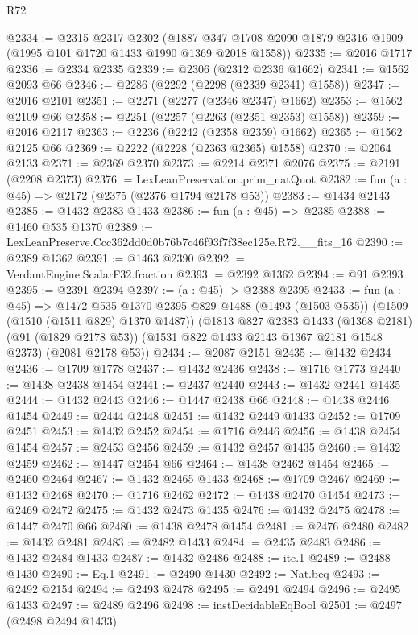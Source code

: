\begin{lexlean}{R72}
\begin{coremodule}
@2334 := @2315
    @2317
    @2302
    (@1887 @347 @1708 @2090 @1879 @2316 @1909 (@1995 @101 @1720 @1433 @1990 @1369 @2018 @1558))
@2335 := @2016 @1717
@2336 := @2334 @2335
@2339 := @2306 (@2312 @2336 @1662)
@2341 := @1562 @2093 @66
@2346 := @2286 (@2292 (@2298 (@2339 @2341) @1558))
@2347 := @2016 @2101
@2351 := @2271 (@2277 (@2346 @2347) @1662)
@2353 := @1562 @2109 @66
@2358 := @2251 (@2257 (@2263 (@2351 @2353) @1558))
@2359 := @2016 @2117
@2363 := @2236 (@2242 (@2358 @2359) @1662)
@2365 := @1562 @2125 @66
@2369 := @2222 (@2228 (@2363 @2365) @1558)
@2370 := @2064 @2133
@2371 := @2369 @2370
@2373 := @2214 @2371 @2076
@2375 := @2191 (@2208 @2373)
@2376 := LexLeanPreservation.prim_natQuot
@2382 := fun (a : @45) => @2172 (@2375 (@2376 @1794 @2178 @53))
@2383 := @1434 @2143
@2385 := @1432 @2383 @1433
@2386 := fun (a : @45) => @2385
@2388 := @1460 @535 @1370
@2389 := LexLeanPreserve.Ccc362dd0d0b76b7c46f93f7f38ec125e.R72.__fits_16
@2390 := @2389 @1362
@2391 := @1463 @2390
@2392 := VerdantEngine.ScalarF32.fraction
@2393 := @2392 @1362
@2394 := @91 @2393
@2395 := @2391 @2394
@2397 := (a : @45) -> @2388 @2395
@2433 := fun (a : @45) =>
  @1472
    @535
    @1370
    @2395
    @829
    @1488
    (@1493 (@1503 @535))
    (@1509 (@1510 (@1511 @829) @1370 @1487))
    (@1813
      @827
      @2383
      @1433
      (@1368 @2181)
      (@91 (@1829 @2178 @53))
      (@1531 @822 @1433 @2143 @1367 @2181 @1548 @2373)
      (@2081 @2178 @53))
@2434 := @2087 @2151
@2435 := @1432 @2434
@2436 := @1709 @1778
@2437 := @1432 @2436
@2438 := @1716 @1773
@2440 := @1438 @2438 @1454
@2441 := @2437 @2440
@2443 := @1432 @2441 @1435
@2444 := @1432 @2443
@2446 := @1447 @2438 @66
@2448 := @1438 @2446 @1454
@2449 := @2444 @2448
@2451 := @1432 @2449 @1433
@2452 := @1709 @2451
@2453 := @1432 @2452
@2454 := @1716 @2446
@2456 := @1438 @2454 @1454
@2457 := @2453 @2456
@2459 := @1432 @2457 @1435
@2460 := @1432 @2459
@2462 := @1447 @2454 @66
@2464 := @1438 @2462 @1454
@2465 := @2460 @2464
@2467 := @1432 @2465 @1433
@2468 := @1709 @2467
@2469 := @1432 @2468
@2470 := @1716 @2462
@2472 := @1438 @2470 @1454
@2473 := @2469 @2472
@2475 := @1432 @2473 @1435
@2476 := @1432 @2475
@2478 := @1447 @2470 @66
@2480 := @1438 @2478 @1454
@2481 := @2476 @2480
@2482 := @1432 @2481
@2483 := @2482 @1433
@2484 := @2435 @2483
@2486 := @1432 @2484 @1433
@2487 := @1432 @2486
@2488 := ite.{1}
@2489 := @2488 @1430
@2490 := Eq.{1}
@2491 := @2490 @1430
@2492 := Nat.beq
@2493 := @2492 @2154
@2494 := @2493 @2478
@2495 := @2491 @2494
@2496 := @2495 @1433
@2497 := @2489 @2496
@2498 := instDecidableEqBool
@2501 := @2497 (@2498 @2494 @1433)

\end{coremodule}
\end{lexlean}
